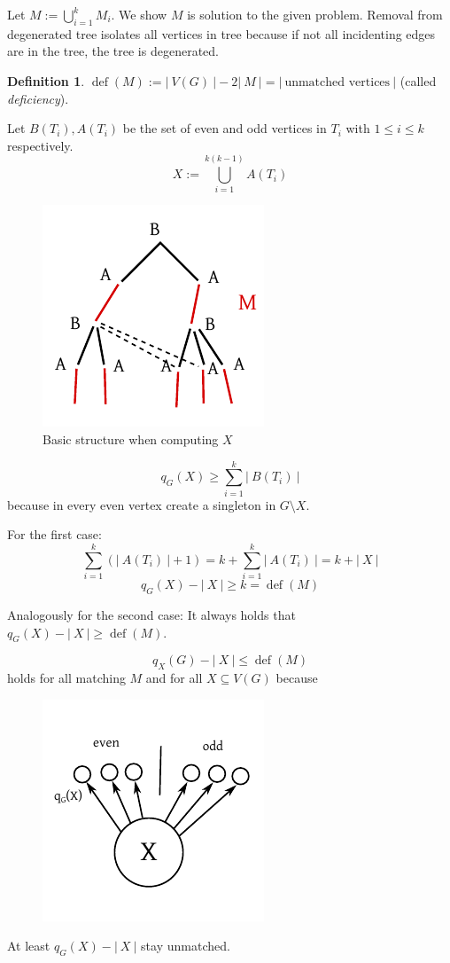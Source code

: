 \documentclass[a4paper]{article}
\theoremstyle{definition}
\newtheorem{definition}[theorem]{Definition}
\newcommand{\card}[1]{\left|\:\!#1\:\!\right|}
\DeclareMathOperator{\deficiency}{def}
\begin{document}
Let $M := \bigcup_{i=1}^k M_i$. We show $M$ is solution to the given problem.
Removal from degenerated tree isolates all vertices in tree because if not all incidenting edges are in the tree, the tree is degenerated.

\begin{definition}
$\deficiency(M) := \card{V(G)} - 2\card{M} = \card{\text{unmatched vertices}}$ (called \emph{deficiency}).
\end{definition}
Let $B(T_i), A(T_i)$ be the set of even and odd vertices in ${T_i}$ with $1 \leq i \leq k$ respectively.
\[
  X := \bigcup_{i=1}^{k(k-1)} A(T_i)
\]
\begin{figure}[!ht]
  \begin{center}
    \includegraphics{img/perfect_matching_set_X.pdf}
    \caption{Basic structure when computing $X$}
  \end{center}
\end{figure}
\[
  q_G(X) \geq \sum_{i=1}^k \card{B(T_i)}
\]
because in every even vertex create a singleton in $G \setminus X$.

For the first case:
\[
  \sum_{i=1}^k \left(\card{A(T_i)} + 1\right) = k + \sum_{i=1}^k \card{A(T_i)} = k + \card{X}
\] \[
  q_G(X) - \card{X} \geq k = \deficiency(M)
\]

Analogously for the second case:
It always holds that $q_G(X) - \card{X} \geq \deficiency(M)$.

\[
  q_X(G) - \card{X} \leq \deficiency(M)
\]
holds for all matching $M$ and for all $X \subseteq V(G)$ because
\begin{figure}[!ht]
  \begin{center}
    \includegraphics{img/perfect_matching_because.pdf}
  \end{center}
\end{figure}
At least $q_G(X) - \card{X}$ stay unmatched.
\end{document}
